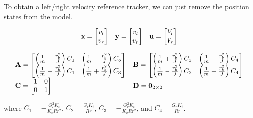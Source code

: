 To obtain a left/right velocity \gls{reference} tracker, we can just remove the
position \glspl{state} from the \gls{model}.

\begin{theorem}
  \label{thm:ramsete_decoupled_ref_tracker}
  \begin{equation*}
    \begin{array}{ccc}
      \mathbf{x} =
      \begin{bmatrix}
        v_l \\
        v_r
      \end{bmatrix} &
      \mathbf{y} =
      \begin{bmatrix}
        v_l \\
        v_r
      \end{bmatrix} &
      \mathbf{u} =
      \begin{bmatrix}
        V_l \\
        V_r
      \end{bmatrix}
    \end{array}
  \end{equation*}

  \begin{equation}
    \begin{array}{ll}
      \mathbf{A} =
      \begin{bmatrix}
        \left(\frac{1}{m} + \frac{r_b^2}{J}\right) C_1 &
        \left(\frac{1}{m} - \frac{r_b^2}{J}\right) C_3 \\
        \left(\frac{1}{m} - \frac{r_b^2}{J}\right) C_1 &
        \left(\frac{1}{m} + \frac{r_b^2}{J}\right) C_3
      \end{bmatrix} &
      \mathbf{B} =
      \begin{bmatrix}
        \left(\frac{1}{m} + \frac{r_b^2}{J}\right) C_2 &
        \left(\frac{1}{m} - \frac{r_b^2}{J}\right) C_4 \\
        \left(\frac{1}{m} - \frac{r_b^2}{J}\right) C_2 &
        \left(\frac{1}{m} + \frac{r_b^2}{J}\right) C_4
      \end{bmatrix} \\
      \mathbf{C} =
      \begin{bmatrix}
        1 & 0 \\
        0 & 1 \\
      \end{bmatrix} &
      \mathbf{D} = \mathbf{0}_{2 \times 2}
    \end{array}
  \end{equation}

  where $C_1 = -\frac{G_l^2 K_t}{K_v R r^2}$, $C_2 = \frac{G_l K_t}{Rr}$,
  $C_3 = -\frac{G_r^2 K_t}{K_v R r^2}$, and $C_4 = \frac{G_r K_t}{Rr}$.
\end{theorem}

